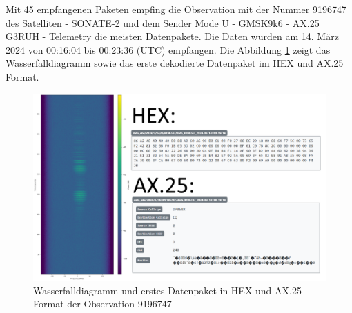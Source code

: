 Mit 45 empfangenen Paketen empfing die Observation mit der Nummer 9196747 des Satelliten  - SONATE-2\grqq{}  und dem Sender \glqq Mode U - GMSK9k6 - AX.25 G3RUH - Telemetry\grqq{} die meisten Datenpakete. Die Daten wurden am 14. März 2024 von 00:16:04 bis 00:23:36 (UTC) empfangen. Die Abbildung \ref{fig:qha_successfull_observation} zeigt das Wasserfalldiagramm sowie das erste dekodierte Datenpaket im HEX und AX.25 Format.

\begin{figure} [H]
	\centering
	\includegraphics[width=\linewidth]{../ref/qha_successfull_operation.png}
	\caption{Wasserfalldiagramm und erstes Datenpaket in HEX und AX.25 Format der Observation 9196747 \cite{noauthor_satnogs_qfh_observation_nodate}}
	\label{fig:qha_successfull_observation}
\end{figure}
